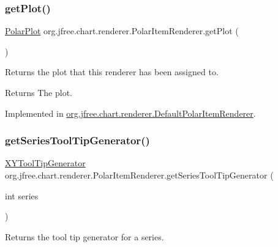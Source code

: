 \subsubsection{\texorpdfstring{get\+Plot()}{getPlot()}}
{\footnotesize\ttfamily \mbox{\hyperlink{classorg_1_1jfree_1_1chart_1_1plot_1_1_polar_plot}{Polar\+Plot}} org.\+jfree.\+chart.\+renderer.\+Polar\+Item\+Renderer.\+get\+Plot (\begin{DoxyParamCaption}{ }\end{DoxyParamCaption})}

Returns the plot that this renderer has been assigned to.

\begin{DoxyReturn}{Returns}
The plot. 
\end{DoxyReturn}


Implemented in \mbox{\hyperlink{classorg_1_1jfree_1_1chart_1_1renderer_1_1_default_polar_item_renderer_a9cd32aebbc67cd428f05aafd7cb2c3ff}{org.\+jfree.\+chart.\+renderer.\+Default\+Polar\+Item\+Renderer}}.

\mbox{\label{interfaceorg_1_1jfree_1_1chart_1_1renderer_1_1_polar_item_renderer_a88c82899310074e147185e59d46060b2}} 
\subsubsection{\texorpdfstring{get\+Series\+Tool\+Tip\+Generator()}{getSeriesToolTipGenerator()}}
{\footnotesize\ttfamily \mbox{\hyperlink{interfaceorg_1_1jfree_1_1chart_1_1labels_1_1_x_y_tool_tip_generator}{X\+Y\+Tool\+Tip\+Generator}} org.\+jfree.\+chart.\+renderer.\+Polar\+Item\+Renderer.\+get\+Series\+Tool\+Tip\+Generator (\begin{DoxyParamCaption}\item[{int}]{series }\end{DoxyParamCaption})}

Returns the tool tip generator for a series.


